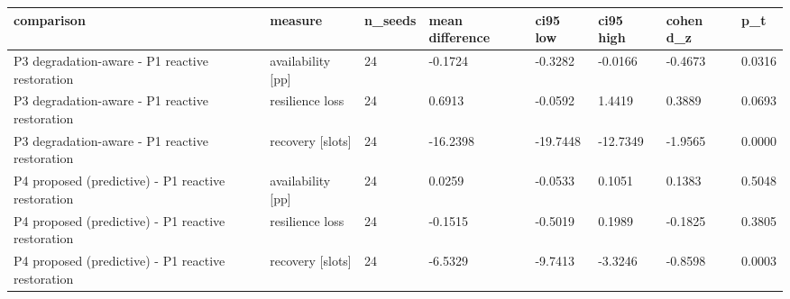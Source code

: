 \begin{tabular}{llllllll}
\toprule
comparison & measure & n\_seeds & mean difference & ci95 low & ci95 high & cohen d\_z & p\_t \\
\midrule
P3 degradation-aware - P1 reactive restoration & availability [pp] & 24 & -0.1724 & -0.3282 & -0.0166 & -0.4673 & 0.0316 \\
P3 degradation-aware - P1 reactive restoration & resilience loss & 24 & 0.6913 & -0.0592 & 1.4419 & 0.3889 & 0.0693 \\
P3 degradation-aware - P1 reactive restoration & recovery [slots] & 24 & -16.2398 & -19.7448 & -12.7349 & -1.9565 & 0.0000 \\
P4 proposed (predictive) - P1 reactive restoration & availability [pp] & 24 & 0.0259 & -0.0533 & 0.1051 & 0.1383 & 0.5048 \\
P4 proposed (predictive) - P1 reactive restoration & resilience loss & 24 & -0.1515 & -0.5019 & 0.1989 & -0.1825 & 0.3805 \\
P4 proposed (predictive) - P1 reactive restoration & recovery [slots] & 24 & -6.5329 & -9.7413 & -3.3246 & -0.8598 & 0.0003 \\
\bottomrule
\end{tabular}
